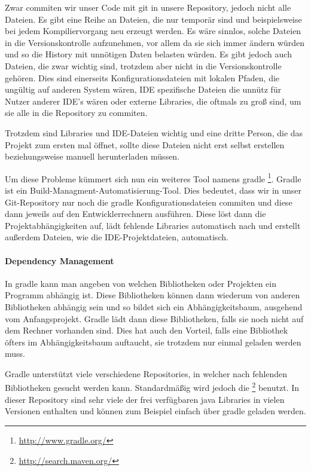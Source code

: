 Zwar commiten wir unser Code mit git in unsere Repository, jedoch nicht alle Dateien. Es gibt eine Reihe an Dateien, die nur temporär sind und beispielsweise bei jedem Kompiliervorgang neu erzeugt werden. Es wäre sinnlos, solche Dateien in die Versionskontrolle aufzunehmen, vor allem da sie sich immer ändern würden und so die History mit unnötigen Daten belasten würden. Es gibt jedoch auch Dateien, die zwar wichtig sind, trotzdem aber nicht in die Versionskontrolle gehören. Dies sind einerseits Konfigurationsdateien mit lokalen Pfaden, die ungültig auf anderen System wären, IDE spezifische Dateien die unnütz für Nutzer anderer IDE's wären oder externe Libraries, die oftmals zu groß sind, um sie alle in die Repository zu commiten.

Trotzdem sind Libraries und IDE-Dateien wichtig und eine dritte Person, die das Projekt zum ersten mal öffnet, sollte diese Dateien nicht erst selbst erstellen beziehungsweise manuell herunterladen müssen.

Um diese Probleme kümmert sich nun ein weiteres Tool namens gradle \footnote{\url{http://www.gradle.org/}}. Gradle ist ein Build-Managment-Automatisierung-Tool. Dies bedeutet, dass wir in unser Git-Repository nur noch die gradle Konfigurationsdateien commiten und diese dann jeweils auf den Entwicklerrechnern ausführen. Diese löst dann die Projektabhängigkeiten auf, lädt fehlende Libraries automatisch nach und erstellt außerdem Dateien, wie die IDE-Projektdateien, automatisch.

\paragraph{Dependency Management}

In gradle kann man angeben von welchen Bibliotheken oder Projekten ein Programm abhängig ist. Diese Bibliotheken können dann wiederum von anderen Bibliotheken abhängig sein und so bildet sich ein Abhängigkeitsbaum, ausgehend vom Anfangsprojekt.
Gradle lädt dann diese Bibliotheken, falls sie noch nicht auf dem Rechner vorhanden sind. Dies hat auch den Vorteil, falls eine Bibliothek öfters im Abhängigkeitsbaum auftaucht, sie trotzdem nur einmal geladen werden muss.\cite[S. 55]{BATWG}

Gradle unterstützt viele verschiedene Repositories, in welcher nach fehlenden Bibliotheken gesucht werden kann. Standardmäßig wird jedoch die  \footnote{\url{http://search.maven.org/}} benutzt.
In dieser Repository sind sehr viele der frei verfügbaren java Libraries in vielen Versionen enthalten und können zum Beispiel einfach über gradle geladen werden.

